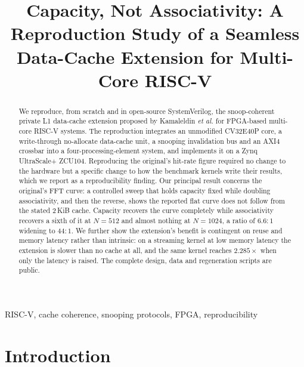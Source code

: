 \documentclass[conference]{IEEEtran}
\begin{document}
\title{Capacity, Not Associativity: A Reproduction Study of a
Seamless Data-Cache Extension for Multi-Core RISC-V}

\author{
\and
{}
}

\maketitle

\begin{abstract}
We reproduce, from scratch and in open-source SystemVerilog, the snoop-coherent
private L1 data-cache extension proposed by Kamaleldin \emph{et al.} for
FPGA-based multi-core RISC-V systems. The reproduction integrates an unmodified
CV32E40P core, a write-through no-allocate data-cache unit, a snooping
invalidation bus and an AXI4 crossbar into a four-processing-element system, and
implements it on a Zynq UltraScale+ ZCU104. Reproducing the original's hit-rate
figure required no change to the hardware but a specific change to how the
benchmark kernels write their results, which we report as a reproducibility
finding. Our principal result concerns the original's FFT curve: a controlled
sweep that holds capacity fixed while doubling associativity, and then the
reverse, shows the reported flat curve does not follow from the stated
2\,KiB cache. Capacity recovers the curve completely while associativity
recovers a sixth of it at $N{=}512$ and almost nothing at $N{=}1024$, a ratio of
$6.6{:}1$ widening to $44{:}1$. We further show the extension's benefit is contingent on reuse and
memory latency rather than intrinsic: on a streaming kernel at low memory
latency the extension is slower than no cache at all, and the same kernel
reaches $2.285\times$ when only the latency is raised. The complete design,
data and regeneration scripts are public.
\end{abstract}

\begin{IEEEkeywords}
RISC-V, cache coherence, snooping protocols, FPGA, reproducibility
\end{IEEEkeywords}

\section{Introduction}
\end{document}
